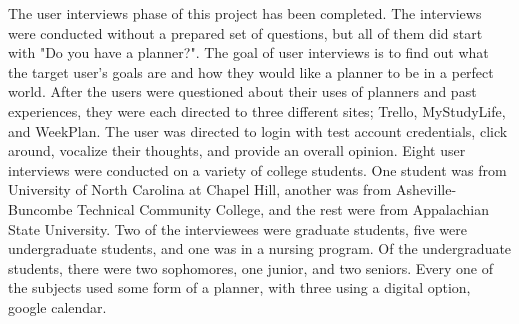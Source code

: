 %
%

The user interviews phase of this project has been completed. The interviews were conducted without a prepared set of questions, but all of them did start with "Do you have a planner?". The goal of user interviews is to find out what the target user's goals are and how they would like a planner to be in a perfect world. After the users were questioned about their uses of planners and past experiences, they were each directed to three different sites; Trello, MyStudyLife, and WeekPlan. The user was directed to login with test account credentials, click around, vocalize their thoughts, and provide an overall opinion. Eight user interviews were conducted on a variety of college students. One student was from University of North Carolina at Chapel Hill, another was from Asheville-Buncombe Technical Community College, and the rest were from Appalachian State University. Two of the interviewees were graduate students, five were undergraduate students, and one was in a nursing program. Of the undergraduate students, there were two sophomores, one junior, and two seniors. Every one of the subjects used some form of a planner, with three using a digital option, google calendar. 


